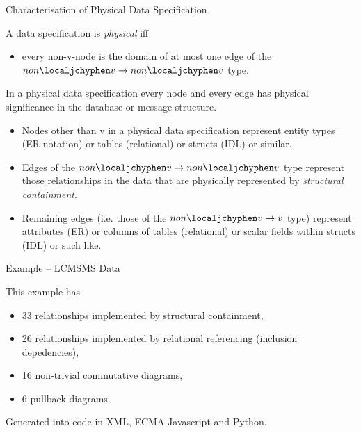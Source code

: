 




\begin{frame}{Characterisation of Physical Data Specification}
\begin{definition}
A data specification is \textit{physical} iff
\begin{itemize}
\item every non-v-node is the domain of at most one edge of the \underline{$non\localjchyphen v \morph non\localjchyphen v$} type.
\end{itemize}
\end{definition}
In a physical data specification every node and every edge has physical significance
in the database or message structure.
\begin{itemize}
\item Nodes other than v in a physical data specification represent entity types (ER-notation) 
or  tables (relational) or structs (IDL) or similar.  
\item Edges of the \underline{$non\localjchyphen v \morph non\localjchyphen v$} type represent those relationships in the data that are physically represented  by \textit{structural containment}.
\item Remaining edges (i.e. those of the \underline{$non\localjchyphen v \morph v$} type) represent
attributes (ER) or columns of tables (relational) or scalar fields within structs (IDL) or such like.  
\end{itemize}
\end{frame}



\begin{frame}{Example -- LCMSMS Data}
\scalebox{0.2}{

}
\pause
\vspace{-5cm}
\begin{block}{}
This example has 
\begin{itemize}
  \item 33  relationships implemented by structural containment, 
  \item 26  relationships implemented by relational referencing (inclusion depedencies),
  \pause \item 16 non-trivial commutative diagrams,
  \pause \item 6 pullback diagrams.
\end{itemize}
Generated into code in XML, ECMA Javascript and Python. 
\end{block}
\end{frame}

